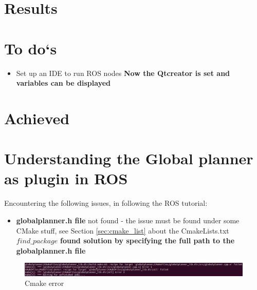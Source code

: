 \documentclass[11pt,a4paper]{article}
\begin{document}

%
%



\section{Results} \label{sec:res}




\section{To do`s} \label{sec:todos}
\begin{itemize}
\item Set up an IDE to run ROS nodes \textbf{Now the Qtcreator is set and variables can be displayed}
\end{itemize}


\section{Achieved}

\vline



\section{Understanding the Global planner as plugin in ROS} \label{sec:glob_plann}

Encountering the following issues, in following the ROS tutorial: 

\begin{itemize}
\item \textbf{globalplanner.h file} not found - the issue must be found under some CMake stuff, see Section \ref{sec:cmake_list} about the CmakeLists.txt $find{\_}package$ \textbf{found solution by specifying the full path to the globalplanner.h file}

\end{itemize} 


\begin{figure}[!htb]
	\center
	\includegraphics[width=1\textwidth]{figures/Cmake_err.png}
	\caption{Cmake error}
	\label{fig:cmake}
\end{figure}
\end{document}
